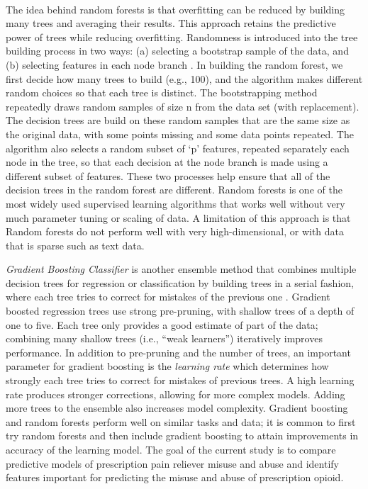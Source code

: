 \\\documentclass[sigconf]{acmart}
\begin{document}
The idea behind random forests is that overfitting can be reduced by building 
many trees and averaging their results. This approach retains the predictive 
power of trees while reducing overfitting. Randomness is introduced into the 
tree building process in two ways: (a) selecting a bootstrap sample of the data, 
and (b) selecting features in each node branch \cite{muller17,raschka17}. In 
building the random forest, we first decide how many trees to build (e.g., 100), 
and the algorithm makes different random choices so that each tree is distinct. 
The bootstrapping method repeatedly draws random samples of size n from the 
data set (with replacement). The decision trees are build on these random 
samples that are the same size as the original data, with some points missing 
and some data points repeated. The algorithm also selects a random subset of `p'
features, repeated separately each node in the tree, so that each decision at 
the node branch is made using a different subset of features. These two 
processes help ensure that all of the decision trees in the random forest 
are different. Random forests is one of the most widely used supervised learning
algorithms that works well without very much parameter tuning or scaling of data. 
A limitation of this approach is that Random forests do not perform well with 
very high-dimensional, or with data that is sparse such as text data.


\emph{Gradient Boosting Classifier} is another ensemble method that combines 
multiple decision trees for regression or classification by building trees 
in a serial fashion, where each tree tries to correct for mistakes of the 
previous one \cite{muller17}. Gradient boosted regression trees use strong 
pre-pruning, with shallow trees of a depth of one to five. Each tree only 
provides a good estimate of part of the data; combining many shallow trees 
(i.e., ``weak learners'') iteratively improves performance. In addition to 
pre-pruning and the number of trees, an important parameter for gradient 
boosting is the \emph{learning rate} which determines how strongly each
tree tries to correct for mistakes of previous trees. A high learning rate
produces stronger corrections, allowing for more complex models. Adding
more trees to the ensemble also increases model complexity. Gradient boosting
and random forests perform well on similar tasks and data; it is common to
first try random forests and then include gradient boosting to attain 
improvements in accuracy of the learning model. The goal of the current study 
is to compare predictive models of prescription pain reliever misuse and 
abuse and identify features important for predicting the misuse and abuse of
prescription opioid. 
\end{document}
